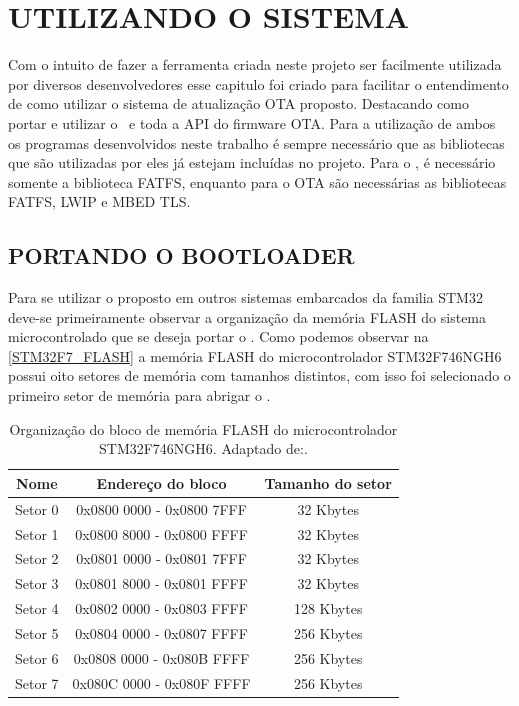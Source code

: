 
\section{UTILIZANDO O SISTEMA}
Com o intuito de fazer a ferramenta criada neste projeto ser facilmente utilizada por diversos desenvolvedores esse capitulo foi criado para facilitar o entendimento de como utilizar o sistema de atualização OTA proposto. Destacando como portar e utilizar o \bootloader\ e toda a API do firmware OTA. Para a utilização de ambos os programas desenvolvidos neste trabalho é sempre necessário que as bibliotecas que são utilizadas por eles já estejam incluídas no projeto. Para o \bootloader, é necessário somente a biblioteca FATFS, enquanto para o OTA são necessárias as bibliotecas FATFS, LWIP e MBED TLS.

\subsection{PORTANDO O BOOTLOADER}
Para se utilizar o \bootloader proposto em outros sistemas embarcados da familia STM32 deve-se primeiramente observar a organização da memória FLASH do sistema microcontrolado que se deseja portar o \bootloader. Como podemos observar na \autoref{STM32F7_FLASH} a memória FLASH do microcontrolador STM32F746NGH6 possui oito setores de memória com tamanhos distintos, com isso foi selecionado o primeiro setor de memória para abrigar o \bootloader.

\begin{table}[H]
    \scriptsize
    \centering
    \begin{tabular}{|c|c|c|}

    \hline
    Nome    & Endereço do bloco         & Tamanho do setor \\ \hline
    Setor 0 & 0x0800 0000 - 0x0800 7FFF & 32 Kbytes        \\ \hline
    Setor 1 & 0x0800 8000 - 0x0800 FFFF & 32 Kbytes        \\ \hline
    Setor 2 & 0x0801 0000 - 0x0801 7FFF & 32 Kbytes        \\ \hline
    Setor 3 & 0x0801 8000 - 0x0801 FFFF & 32 Kbytes        \\ \hline
    Setor 4 & 0x0802 0000 - 0x0803 FFFF & 128 Kbytes       \\ \hline
    Setor 5 & 0x0804 0000 - 0x0807 FFFF & 256 Kbytes       \\ \hline
    Setor 6 & 0x0808 0000 - 0x080B FFFF & 256 Kbytes       \\ \hline
    Setor 7 & 0x080C 0000 - 0x080F FFFF & 256 Kbytes       \\ \hline
    \end{tabular}
    \caption{Organização do bloco de memória FLASH do microcontrolador STM32F746NGH6. \newline Adaptado de:\cite{STM32F7}.}
    \label{STM32F7_FLASH}
    \end{table}


